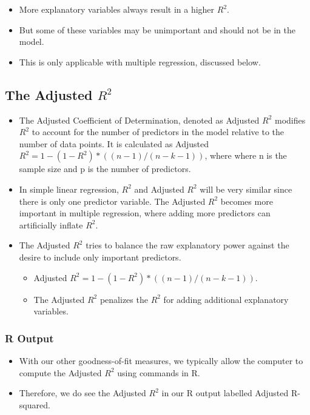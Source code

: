 \documentclass[
  letterpaper,
  DIV=11,
  numbers=noendperiod]{scrreprt}
\providecommand{\tightlist}{%
  \setlength{\itemsep}{0pt}\setlength{\parskip}{0pt}}\usepackage{longtable,booktabs,array}
\begin{document}
\begin{itemize}
\tightlist
\item
  More explanatory variables always result in a higher \(R^2\).
\item
  But some of these variables may be unimportant and should not be in
  the model.
\item
  This is only applicable with multiple regression, discussed below.
\end{itemize}

\subsection{\texorpdfstring{The Adjusted
\(R^2\)}{The Adjusted R\^{}2}}\label{the-adjusted-r2}

\begin{itemize}
\item
  The Adjusted Coefficient of Determination, denoted as Adjusted \(R^2\)
  modifies \(R^2\) to account for the number of predictors in the model
  relative to the number of data points. It is calculated as Adjusted
  \(R^2 = 1-(1-R^2)*((n-1)/(n-k-1))\), where where n is the sample size
  and p is the number of predictors.
\item
  In simple linear regression, \(R^2\) and Adjusted \(R^2\) will be very
  similar since there is only one predictor variable. The Adjusted
  \(R^2\) becomes more important in multiple regression, where adding
  more predictors can artificially inflate \(R^2\).
\item
  The Adjusted \(R^2\) tries to balance the raw explanatory power
  against the desire to include only important predictors.

  \begin{itemize}
  \tightlist
  \item
    Adjusted \(R^2 = 1-(1-R^2)*((n-1)/(n-k-1))\).
  \item
    The Adjusted \(R^2\) penalizes the \(R^2\) for adding additional
    explanatory variables.
  \end{itemize}
\end{itemize}

\subsubsection{R Output}\label{r-output-1}

\begin{itemize}
\tightlist
\item
  With our other goodness-of-fit measures, we typically allow the
  computer to compute the Adjusted \(R^2\) using commands in R.\\
\item
  Therefore, we do see the Adjusted \(R^2\) in our R output labelled
  Adjusted R-squared.
\end{itemize}
\end{document}
